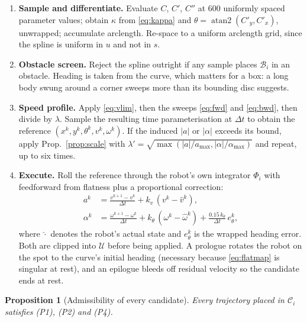 \documentclass[conference]{IEEEtran}
\newtheorem{proposition}{Proposition}
\newcommand{\Cand}{\mathcal{C}}
\newcommand{\Bod}{\mathcal{B}}
\newcommand{\Uc}{\mathcal{U}}
\begin{document}
\begin{enumerate}
  \item \textbf{Sample and differentiate.} Evaluate $C$, $C'$, $C''$ at $600$ uniformly
        spaced parameter values; obtain $\kappa$ from \eqref{eq:kappa} and
        $\theta = \operatorname{atan2}(C'_y,C'_x)$, unwrapped; accumulate arclength.
        Re-space to a uniform arclength grid, since the spline is uniform in $u$ and not in
        $s$.
  \item \textbf{Obstacle screen.} Reject the spline outright if any sample places
        $\Bod_i$ in an obstacle. Heading is taken from the curve, which matters for a box:
        a long body swung around a corner sweeps more than its bounding disc suggests.
  \item \textbf{Speed profile.} Apply \eqref{eq:vlim}, then the sweeps \eqref{eq:fwd} and
        \eqref{eq:bwd}, then divide by $\lambda$. Sample the resulting time
        parameterisation at $\Delta t$ to obtain the reference
        $(x^k, y^k, \theta^k, v^k, \omega^k)$. If the induced $|a|$ or $|\alpha|$ exceeds
        its bound, apply Prop.~\ref{prop:scale} with
        $\lambda' = \sqrt{\max(|a|/a_{\max}, |\alpha|/\alpha_{\max})}$ and repeat, up to
        six times.
  \item \textbf{Execute.} Roll the reference through the robot's own integrator $\Phi_i$
        with feedforward from flatness plus a proportional correction:
        \begin{align}
          a^k &= \frac{v^{k+1}-v^k}{\Delta t} + k_v\,(v^k - \hat v^k), \label{eq:ff-a}\\
          \alpha^k &= \frac{\omega^{k+1}-\omega^k}{\Delta t}
                      + k_\theta\,(\omega^k - \hat\omega^k)
                      + \frac{0.15\,k_\theta}{\Delta t}\, e_\theta^k, \label{eq:ff-al}
        \end{align}
        where $\hat{\cdot}$ denotes the robot's actual state and $e_\theta^k$ is the wrapped
        heading error. Both are clipped into $\Uc$ before being applied. A prologue rotates
        the robot on the spot to the curve's initial heading (necessary because
        \eqref{eq:flatmap} is singular at rest), and an epilogue bleeds off residual
        velocity so the candidate ends at rest.
\end{enumerate}

\begin{proposition}[Admissibility of every candidate]
\label{prop:admissible}
Every trajectory placed in $\Cand_i$ satisfies (P1), (P2) and (P4).
\end{proposition}
\end{document}

